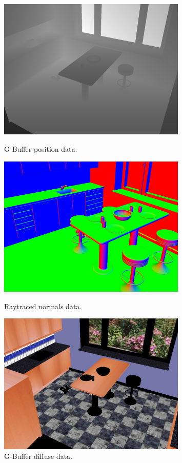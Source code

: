\begin{figure}[ht]
	\begin{minipage}[b]{0.3\linewidth}
		\centering
		\includegraphics[width=0.8\textwidth]{Media/raster_depth.png}
		\caption{G-Buffer position data.}
		\label{fig:gbufferpos}
	\end{minipage}
	\begin{minipage}[b]{0.3\linewidth}
			\centering
		  \includegraphics[width=0.8\textwidth]{Media/ray_normals.png}
		  \caption{Raytraced normals data.}
		  \label{fig:raynormals}
		\end{minipage}
		\begin{minipage}[b]{0.3\linewidth}
			\centering
		  \includegraphics[width=0.8\textwidth]{Media/raster_diffuse.png}
		  \caption{G-Buffer diffuse data.}
		  \label{fig:gbufferdiff}
		\end{minipage}
\end{figure}

